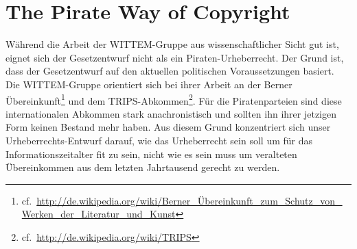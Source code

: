 \section{The Pirate Way of Copyright}


Während die Arbeit der WITTEM-Gruppe aus wissenschaftlicher Sicht gut ist, eignet sich der Gesetzentwurf nicht als ein Piraten-Urheberrecht. Der Grund ist, dass der Gesetzentwurf auf den aktuellen politischen Voraussetzungen basiert. Die WITTEM-Gruppe orientiert sich bei ihrer Arbeit an der Berner Übereinkunft\footnote{cf.~\url{http://de.wikipedia.org/wiki/Berner_Übereinkunft_zum_Schutz_von_Werken_der_Literatur_und_Kunst}} und dem TRIPS-Abkommen\footnote{cf.~\url{http://de.wikipedia.org/wiki/TRIPS}}. Für die Piratenparteien sind diese internationalen Abkommen stark anachronistisch und sollten ihn ihrer jetzigen Form keinen Bestand mehr haben. Aus diesem Grund konzentriert sich unser Urheberrechts-Entwurf darauf, wie das Urheberrecht sein soll um für das Informationszeitalter fit zu sein, nicht wie es sein muss um veralteten Übereinkommen aus dem letzten Jahrtausend gerecht zu werden.


